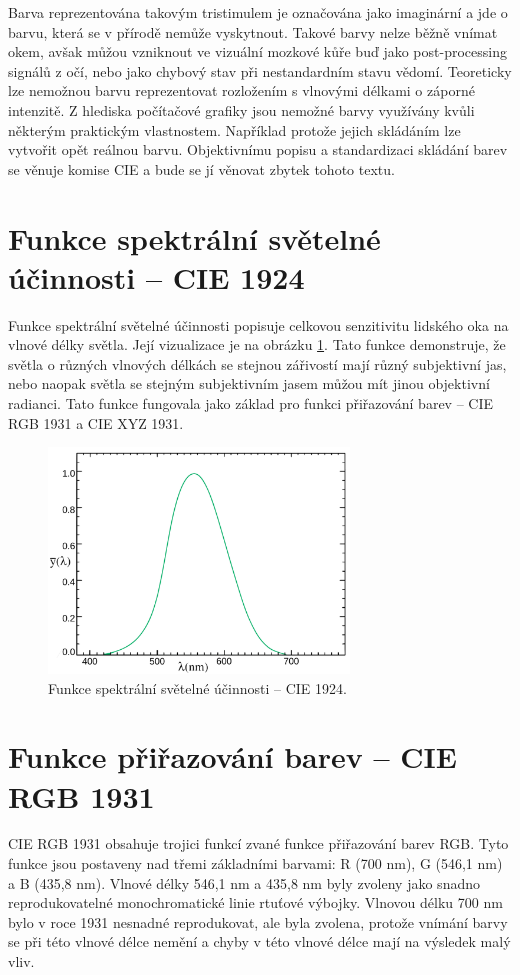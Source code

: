 \documentclass[a4paper, 12pt, titlepage]{article}
\begin{document}
  Barva reprezentována takovým tristimulem je označována jako imaginární a jde o barvu, která se v přírodě nemůže vyskytnout.
  Takové barvy nelze běžně vnímat okem, avšak můžou vzniknout ve vizuální mozkové kůře buď jako post-processing signálů z očí, nebo jako chybový stav při nestandardním stavu vědomí.
  Teoreticky lze nemožnou barvu reprezentovat rozložením s vlnovými délkami o záporné intenzitě.
  Z hlediska počítačové grafiky jsou nemožné barvy využívány kvůli některým praktickým vlastnostem.
  Například protože jejich skládáním lze vytvořit opět reálnou barvu.
  Objektivnímu popisu a standardizaci skládání barev se věnuje komise CIE a bude se jí věnovat zbytek tohoto textu.

  \section{Funkce spektrální světelné účinnosti -- CIE 1924}
  Funkce spektrální světelné účinnosti popisuje celkovou senzitivitu lidského oka na vlnové délky světla.
  Její vizualizace je na obrázku \ref{fig:1924}.
  Tato funkce demonstruje, že světla o různých vlnových délkách se stejnou zářivostí mají různý subjektivní jas, nebo naopak světla se stejným subjektivním jasem můžou mít jinou objektivní radianci. \cite{Abraham2016}
  Tato funkce fungovala jako základ pro funkci přiřazování barev -- CIE RGB 1931 a CIE XYZ 1931.

  \begin{figure}[h!]
	\centering
	\includegraphics[width=8cm]{CIE_1931_Luminosity.pdf}
	\caption{Funkce spektrální světelné účinnosti -- CIE 1924.}
	\label{fig:1924}
	\end{figure}

  \section{Funkce přiřazování barev -- CIE RGB 1931}
  CIE RGB 1931 obsahuje trojici funkcí zvané funkce přiřazování barev RGB.
  Tyto funkce jsou postaveny nad třemi základními barvami: R (700 nm), G (546,1 nm) a B (435,8 nm).
  Vlnové délky 546,1 nm a 435,8 nm byly zvoleny jako snadno reprodukovatelné monochromatické linie rtuťové výbojky.
  Vlnovou délku 700 nm bylo v roce 1931 nesnadné reprodukovat, ale byla zvolena, protože vnímání barvy se při této vlnové délce nemění a chyby v této vlnové délce mají na výsledek malý vliv. \cite{Abraham2016, Walker1996, ciexyz}
\end{document}
